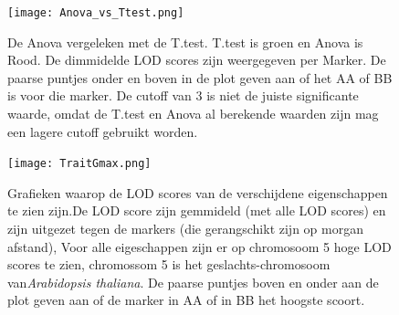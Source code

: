 \documentclass[12pt,a4paper]{article}
\begin{document}
\pagebreak

\listoffigures
\pagebreak

\begin{figure}
\vspace{-6cm}
\hspace{-1.5cm}
\texttt{[image: Anova\_vs\_Ttest.png]}
\caption[Anova vergeleken met T.test]{De Anova vergeleken met de T.test. T.test is groen en Anova is Rood. De dimmidelde LOD scores zijn weergegeven per Marker. De paarse puntjes onder en boven in de plot geven aan of het AA of BB is voor die marker. De cutoff van 3 is niet de juiste significante waarde, omdat de T.test en Anova al berekende waarden zijn mag een lagere cutoff gebruikt worden.}
\FloatBarrier
\end{figure}


\begin{figure}
\vspace{-1.5cm}
\hspace{-2cm}
\texttt{[image: TraitGmax.png]}
\quad\
\caption[LOD scores per eigenschap]{Grafieken waarop de LOD scores van de verschijdene eigenschappen te zien zijn.De LOD score zijn gemmideld (met alle LOD scores) en zijn uitgezet tegen de markers (die gerangschikt zijn op morgan afstand), Voor alle eigeschappen zijn er op chromosoom 5  hoge LOD scores te zien, chromossom 5  is het geslachts-chromosoom van\textit{Arabidopsis thaliana}. De paarse puntjes boven en onder aan de plot geven aan of de marker in  AA of in BB het hoogste scoort.}
\end{figure}
\end{document}

